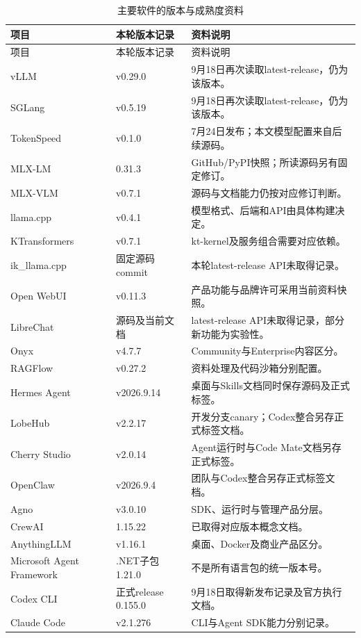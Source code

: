 {\small
\begin{longtable}{@{}P{44mm}P{41mm}P{69mm}@{}}
\caption{主要软件的版本与成熟度资料}\label{tab:versions}\\
\toprule 项目 & 本轮版本记录 & 资料说明\\\midrule
\endfirsthead
\toprule 项目 & 本轮版本记录 & 资料说明\\\midrule
\endhead
\bottomrule\endfoot
vLLM & v0.29.0 & 9月18日再次读取latest-release，仍为该版本。\\
SGLang & v0.5.19 & 9月18日再次读取latest-release，仍为该版本。\\
TokenSpeed & v0.1.0 & 7月24日发布；本文模型配置来自后续源码。\\
MLX-LM & 0.31.3 & GitHub/PyPI快照；所读源码另有固定修订。\\
MLX-VLM & v0.7.1 & 源码与文档能力仍按对应修订判断。\\
llama.cpp & v0.4.1 & 模型格式、后端和API由具体构建决定。\\
KTransformers & v0.7.1 & kt-kernel及服务组合需要对应依赖。\\
ik\_llama.cpp & 固定源码commit & 本轮latest-release API未取得记录。\\
Open WebUI & v0.11.3 & 产品功能与品牌许可采用当前资料快照。\\
LibreChat & 源码及当前文档 & latest-release API未取得记录，部分新功能为实验性。\\
Onyx & v4.7.7 & Community与Enterprise内容区分。\\
RAGFlow & v0.27.2 & 资料处理及代码沙箱分别配置。\\
Hermes Agent & v2026.9.14 & 桌面与Skills文档同时保存源码及正式标签。\\
LobeHub & v2.2.17 & 开发分支canary；Codex整合另存正式标签文档。\\
Cherry Studio & v2.0.14 & Agent运行时与Code Mate文档另存正式标签。\\
OpenClaw & v2026.9.4 & 团队与Codex整合另存正式标签文档。\\
Agno & v3.0.10 & SDK、运行时与管理产品分层。\\
CrewAI & 1.15.22 & 已取得对应版本概念文档。\\
AnythingLLM & v1.16.1 & 桌面、Docker及商业产品区分。\\
Microsoft Agent Framework & .NET子包1.21.0 & 不是所有语言包的统一版本号。\\
Codex CLI & 正式release 0.155.0 & 9月18日取得新发布记录及官方执行文档。\\
Claude Code & v2.1.276 & CLI与Agent SDK能力分别记录。\\
\end{longtable}
}


